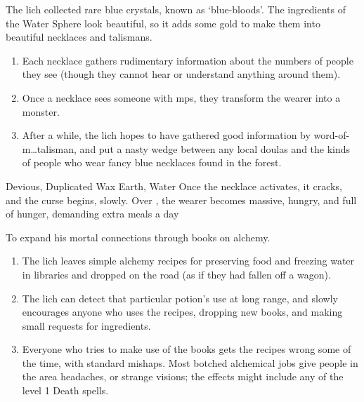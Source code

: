 \begin{multicols}{2}
\begin{dlist}
  The lich collected rare blue crystals, known as `blue-bloods'.
  The \glspl{ingredient} of the Water Sphere look beautiful, so it adds some gold to make them into beautiful necklaces and \glspl{talisman}.
  \begin{enumerate}
    \item
    Each necklace gathers rudimentary information about the numbers of people they see (though they cannot hear or understand anything around them).
    \item
    Once a necklace sees someone with \glspl{mp}, they transform the wearer into a monster.
    \item
    After a while, the lich hopes to have gathered good information by word-of-m\ldots \gls{talisman}, and put a nasty wedge between any local \glspl{doula} and the kinds of people who wear fancy blue necklaces found in the forest.
  \end{enumerate}
      {Devious, Duplicated}%
      {Wax}%
      {Earth, Water}%
      {}%
      {Once the necklace activates, it cracks, and the curse begins, slowly.
      Over \showOnset, the wearer becomes massive, hungry, and full of hunger, demanding  extra meals a day}%
      {}%
    \showTalisman
  \item
  To expand his mortal connections through books on \gls{alchemy}.
  \begin{enumerate}
    \item
    The lich leaves simple \gls{alchemy} recipes for preserving food and freezing water in libraries and dropped on the road (as if they had fallen off a wagon).
    \item
    The lich can detect that particular potion's use at long range, and slowly encourages anyone who uses the recipes, dropping new books, and making small requests for \glspl{ingredient}.
    \item
    Everyone who tries to make use of the books gets the recipes wrong some of the time, with standard mishaps.
    Most botched alchemical jobs give people in the area headaches, or strange visions; the effects might include any of the level 1 Death spells.%
  \end{enumerate}
\end{dlist}

\end{multicols}

